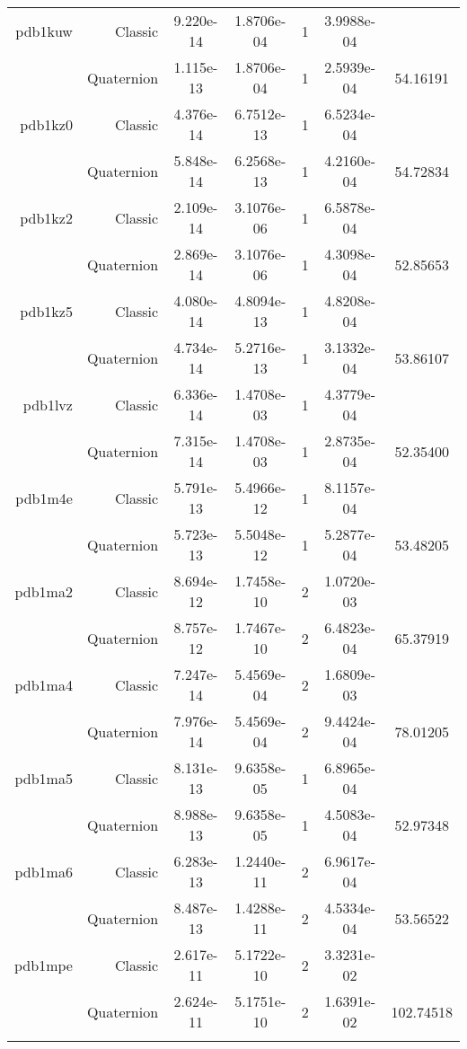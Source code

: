 \begin{xltabular}{\textwidth}{r|rS[table-format=1.3e+2]S[table-format=1.4e+2]cS[table-format=1.4e+2]S[table-format=-1.5]}
pdb1kuw & Classic & 9.220e-14 & 1.8706e-04 & 1 & 3.9988e-04 & \\
& Quaternion & 1.115e-13 & 1.8706e-04 & 1 & 2.5939e-04 & 54.16191\\  \addlinespace
pdb1kz0 & Classic & 4.376e-14 & 6.7512e-13 & 1 & 6.5234e-04 & \\
& Quaternion & 5.848e-14 & 6.2568e-13 & 1 & 4.2160e-04 & 54.72834\\  \addlinespace
pdb1kz2 & Classic & 2.109e-14 & 3.1076e-06 & 1 & 6.5878e-04 & \\
& Quaternion & 2.869e-14 & 3.1076e-06 & 1 & 4.3098e-04 & 52.85653\\  \addlinespace
pdb1kz5 & Classic & 4.080e-14 & 4.8094e-13 & 1 & 4.8208e-04 & \\
& Quaternion & 4.734e-14 & 5.2716e-13 & 1 & 3.1332e-04 & 53.86107\\  \addlinespace
pdb1lvz & Classic & 6.336e-14 & 1.4708e-03 & 1 & 4.3779e-04 & \\
& Quaternion & 7.315e-14 & 1.4708e-03 & 1 & 2.8735e-04 & 52.35400\\  \addlinespace
pdb1m4e & Classic & 5.791e-13 & 5.4966e-12 & 1 & 8.1157e-04 & \\
& Quaternion & 5.723e-13 & 5.5048e-12 & 1 & 5.2877e-04 & 53.48205\\  \addlinespace
pdb1ma2 & Classic & 8.694e-12 & 1.7458e-10 & 2 & 1.0720e-03 & \\
& Quaternion & 8.757e-12 & 1.7467e-10 & 2 & 6.4823e-04 & 65.37919\\  \addlinespace
pdb1ma4 & Classic & 7.247e-14 & 5.4569e-04 & 2 & 1.6809e-03 & \\
& Quaternion & 7.976e-14 & 5.4569e-04 & 2 & 9.4424e-04 & 78.01205\\  \addlinespace
pdb1ma5 & Classic & 8.131e-13 & 9.6358e-05 & 1 & 6.8965e-04 & \\
& Quaternion & 8.988e-13 & 9.6358e-05 & 1 & 4.5083e-04 & 52.97348\\  \addlinespace
pdb1ma6 & Classic & 6.283e-13 & 1.2440e-11 & 2 & 6.9617e-04 & \\
& Quaternion & 8.487e-13 & 1.4288e-11 & 2 & 4.5334e-04 & 53.56522\\  \addlinespace
pdb1mpe & Classic & 2.617e-11 & 5.1722e-10 & 2 & 3.3231e-02 & \\
& Quaternion & 2.624e-11 & 5.1751e-10 & 2 & 1.6391e-02 & 102.74518\\  \addlinespace

\end{xltabular}
